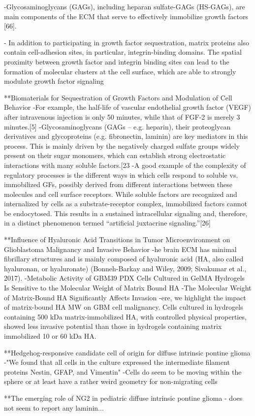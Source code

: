 \documentclass[11pt,a4paper]{article}
\begin{document}
-Glycosaminoglycans (GAGs), including heparan sulfate-GAGs (HS-GAGs), are main components of the ECM that serve to effectively immobilize growth factors [66]. 

- In addition to participating in growth factor sequestration, matrix proteins also contain cell-adhesion sites, in particular, integrin-binding domains. The spatial proximity between growth factor and integrin binding sites can lead to the formation of molecular clusters at the cell surface, which are able to strongly modulate growth factor signaling

**Biomaterials for Sequestration of Growth Factors and Modulation of Cell Behavior
-For example, the half-life of
vascular endothelial growth factor (VEGF) after intravenous injection is only 50 minutes, while that
of FGF-2 is merely 3 minutes.[5] 
-Glycosaminoglycans (GAGs – e.g. heparin), their proteoglycan derivatives and glycoproteins (e.g.
fibronectin, laminin) are key mediators in this process. This is mainly driven by the negatively
charged sulfate groups widely present on their sugar monomers, which can establish strong
electrostatic interactions with many soluble factors.[23
-A good example of the complexity of regulatory processes is the different ways in which cells
respond to soluble vs. immobilized GFs, possibly derived from different interactions between these
molecules and cell surface receptors. While soluble factors are recognized and internalized by cells
as a substrate-receptor complex, immobilized factors cannot be endocytosed. This results in a
sustained intracellular signaling and, therefore, in a distinct phenomenon termed “artificial juxtacrine
signaling.”[26] 


**Influence of Hyaluronic Acid Transitions in Tumor Microenvironment on Glioblastoma Malignancy and Invasive Behavior
-he brain ECM has minimal fibrillary structures and is mainly composed of hyaluronic acid (HA, also called hyaluronan, or hyaluronate) (Bonneh-Barkay and Wiley, 2009; Sivakumar et al., 2017).
-Metabolic Activity of GBM39 PDX Cells Cultured in GelMA Hydrogels Is Sensitive to the Molecular Weight of Matrix Bound HA
-The Molecular Weight of Matrix-Bound HA Significantly Affects Invasion
-ere, we highlight the impact of matrix-bound HA MW on GBM cell malignancy. Cells cultured in hydrogels containing 500 kDa matrix-immobilized HA, with controlled physical properties, showed less invasive potential than those in hydrogels containing matrix immobilized 10 or 60 kDa HA.

**Hedgehog-responsive candidate cell of origin for diffuse intrinsic pontine glioma
-"We found that all cells in the culture expressed the intermediate filament proteins Nestin, GFAP, and Vimentin"
-Cells do seem to be moving within the sphere or at least have a rather weird geometry for non-migrating cells

**The emerging role of NG2 in pediatric diffuse intrinsic pontine glioma
- does not seem to report any laminin...
\end{document}
